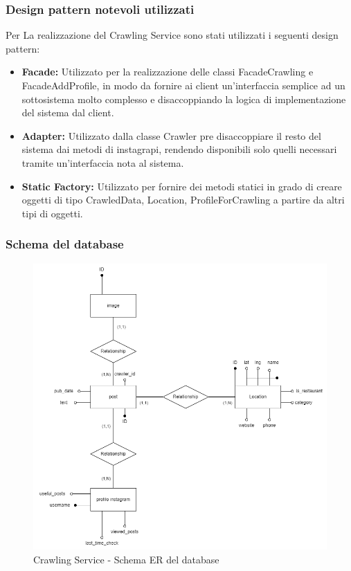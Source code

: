 \subsubsection{Design pattern notevoli utilizzati}
Per La realizzazione del Crawling Service sono stati utilizzati i seguenti design pattern:
\begin{itemize}
    \item \textbf{Facade:} Utilizzato per la realizzazione delle classi FacadeCrawling e FacadeAddProfile, in modo da fornire ai client un'interfaccia semplice ad un sottosistema molto complesso e disaccoppiando la logica di implementazione del sistema dal client.
    \item \textbf{Adapter:} Utilizzato dalla classe Crawler pre disaccoppiare il resto del sistema dai metodi di instagrapi, rendendo disponibili solo quelli necessari tramite un'interfaccia nota al sistema.
    \item \textbf{Static Factory:} Utilizzato per fornire dei metodi statici in grado di creare oggetti di tipo CrawledData, Location, ProfileForCrawling a partire da altri tipi di oggetti.
\end{itemize}

\subsubsection{Schema del database}
\begin{figure}[h]
    \centering
    \includegraphics[scale=0.35]{Contenuto/Immagini/ER-CS.png}
    \caption{Crawling Service - Schema ER del database}
\end{figure}